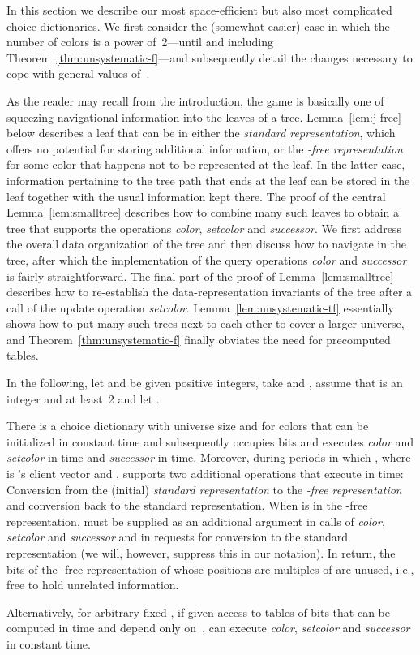 \documentclass[envcountsame,envcountsect,undated,nolinenumbers]{lnthi}
\def\Tvn#1{\hbox{\textit{#1\/}}}
\begin{document}
In this section we describe our most space-efficient
but also most complicated choice dictionaries.
We first consider the (somewhat easier) case
in which the number  of colors is a power of~2---until
and including Theorem~\ref{thm:unsystematic-f}---and
subsequently detail the changes necessary to cope
with general values of~.

As the reader may recall from the introduction,
the game is basically one of squeezing navigational
information into the leaves of a tree.
Lemma~\ref{lem:j-free} below describes a leaf that
can be in either the \emph{standard representation},
which offers no potential for storing
additional information,
or the \emph{-free representation} for some
color  that happens not to be represented
at the leaf.
In the latter case, information pertaining to the
tree path that ends at the leaf can be stored
in the leaf together with the usual information
kept there.
The proof of the central Lemma~\ref{lem:smalltree} describes how
to combine many such leaves to obtain a
tree that supports the operations \Tvn{color},
\Tvn{setcolor} and \Tvn{successor}.
We first address the overall data organization of the tree
and then discuss how to navigate in the tree,
after which the implementation of the query operations
\Tvn{color} and \Tvn{successor} is fairly
straightforward.
The final part of the proof of
Lemma~\ref{lem:smalltree} describes how to
re-establish the data-representation invariants
of the tree
after a call of the update operation \Tvn{setcolor}.
Lemma~\ref{lem:unsystematic-tf} essentially shows
how to put many such trees next to each other
to cover a larger universe, and
Theorem~\ref{thm:unsystematic-f} finally obviates
the need for precomputed tables.

In the following, let  and  be given
positive integers, take  and , assume
that  is an integer and at
least~2 and let .

\begin{lemma}
\label{lem:j-free}There is a choice dictionary 
with universe size  and for  colors
that can be initialized in constant
time and subsequently occupies  bits and
executes \Tvn{color} and \Tvn{setcolor}
in  time and
\Tvn{successor} in  time.
Moreover, during periods in which
, where
 is 's client vector and
,
 supports two additional operations
that execute in  time:
Conversion from
the (initial) \emph{standard representation}
to the \emph{-free representation}
and conversion back to
the standard representation.
When  is in the -free representation, 
must be supplied as an additional argument in
calls of \Tvn{color}, \Tvn{setcolor} and \Tvn{successor}
and in requests for conversion to the standard representation
(we will, however, suppress this in our notation).
In return, the  bits
of the -free representation of 
whose positions are multiples of  are unused,
i.e., free to hold unrelated information.

Alternatively, for arbitrary fixed ,
if given access to tables of
 bits that can be computed in
 time and depend
only on~,  can execute
\Tvn{color}, \Tvn{setcolor} and \Tvn{successor}
in constant time.
\end{lemma}
\end{document}
